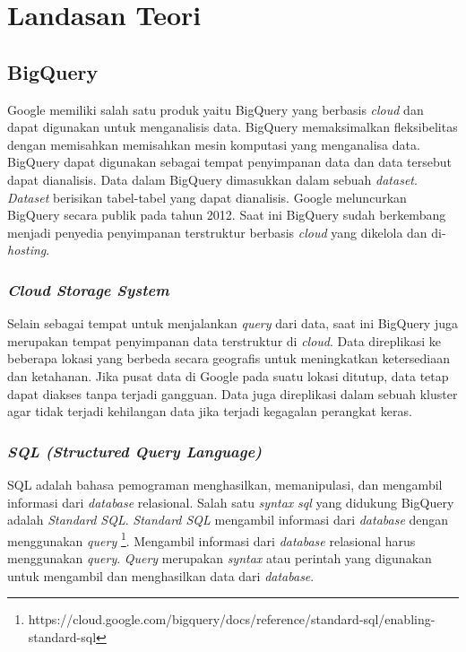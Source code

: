 \chapter{Landasan Teori}
\label{chap:teori}

\section{BigQuery}
Google memiliki salah satu produk yaitu BigQuery yang berbasis \textit{cloud} dan dapat digunakan untuk menganalisis data\cite{bqa, bqIntroduction}. BigQuery memaksimalkan fleksibelitas dengan memisahkan memisahkan mesin komputasi yang menganalisa data. BigQuery dapat digunakan sebagai tempat penyimpanan data dan data tersebut dapat dianalisis. Data dalam BigQuery dimasukkan dalam sebuah \textit{dataset}. \textit{Dataset} berisikan tabel-tabel yang dapat dianalisis. Google meluncurkan BigQuery secara publik pada tahun 2012. Saat ini BigQuery sudah berkembang menjadi penyedia penyimpanan terstruktur berbasis \textit{cloud} yang dikelola dan di-\textit{hosting}. 

\subsection{\textit{Cloud Storage System}}
Selain sebagai tempat untuk menjalankan \textit{query} dari data, saat ini BigQuery juga merupakan tempat penyimpanan data terstruktur di \textit{cloud}. Data direplikasi ke beberapa lokasi yang berbeda secara geografis untuk meningkatkan ketersediaan dan ketahanan. Jika pusat data di Google pada suatu lokasi ditutup, data tetap dapat diakses tanpa terjadi gangguan. Data juga direplikasi dalam sebuah kluster agar tidak terjadi kehilangan data jika terjadi kegagalan perangkat keras. 

\subsection{\textit{SQL (Structured Query Language) \cite{book:22611}}}
SQL adalah bahasa pemograman menghasilkan, memanipulasi, dan mengambil informasi dari \textit{database} relasional. Salah satu \textit{syntax} \textit{sql} yang didukung BigQuery adalah \textit{Standard SQL}. \textit{Standard SQL} mengambil informasi dari \textit{database} dengan menggunakan \textit{query} \footnote{https://cloud.google.com/bigquery/docs/reference/standard-sql/enabling-standard-sql}. Mengambil informasi dari \textit{database} relasional harus menggunakan \textit{query}. \textit{Query} merupakan \textit{syntax} atau perintah yang digunakan untuk mengambil dan menghasilkan data dari \textit{database}.

